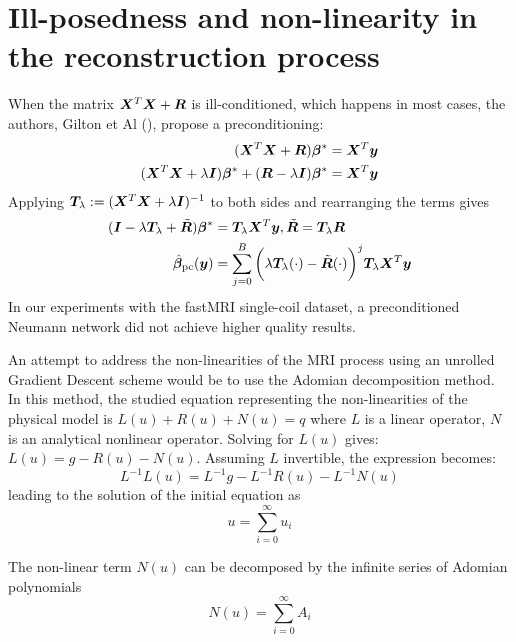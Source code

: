 \documentclass{article}
\begin{document}
\section{Ill-posedness and non-linearity in the reconstruction process}
When the matrix $\bm{X}^T \bm{X} + \bm{R}$ is ill-conditioned, which happens in most cases, the authors, Gilton et Al (\cite{DBLP:journals/corr/abs-1901-03707}),  propose a preconditioning:
\begin{align*}
	(\bm{X}^T \bm{X} + \bm{R}) \bm{\beta}^{\ast} &=	\bm{X}^T \bm{y} \\
	(\bm{X}^T \bm{X} + \lambda \bm{I})  \bm{\beta}^{\ast} + ( \bm{R} -  \lambda \bm{I})   \bm{\beta}^{\ast} &= \bm{X}^T \bm{y} \\
\end{align*}
Applying $	\bm{T}_{\lambda} := (\bm{X}^T \bm{X} + \lambda \bm{I})^{-1}$ to both sides and rearranging the terms gives
\begin{align*}
	(\bm{I} - \lambda \bm{T}_{\lambda} + \tilde{\bm{R}}) \bm{\beta}^{\ast} &= \bm{T}_{\lambda} \bm{X}^T \bm{y}, 
	 \tilde{\bm{R}} =  \bm{T}_{\lambda} \bm{R} \\
\hat{\bm{\beta}}_{\text{pc}}(\bm{y})  &=  \sum_{j=0}^{B}  \bigg( \lambda  \bm{T}_{\lambda}(\cdot) -   \tilde{\bm{R}}(\cdot) \bigg)^j  \bm{T}_{\lambda} \bm{X}^T \bm{y} \\		 
\end{align*}
In our experiments with the fastMRI single-coil dataset, a preconditioned Neumann network did not achieve higher quality results.

An attempt to address the non-linearities of the MRI process using an unrolled Gradient Descent scheme would be to use the Adomian decomposition method.
In this method, the studied equation representing the non-linearities of the physical model is $L(u) + R(u) + N(u)  = q$ where $L$ is a linear operator, $N$ is an analytical nonlinear operator. Solving for $L(u)$ gives: $L(u) = g - R(u) -N(u)$. Assuming $L$ invertible, the expression becomes:
\begin{equation}
	L^{-1} L (u) = L^{-1} g - L^{-1} R(u) - L^{-1} N(u) \label{eq:adom1}
\end{equation}
leading to the solution of the initial equation as
\begin{equation}
	u = \sum_{i=0}^\infty u_i \label{eq:adom2}
\end{equation}	
 
 The non-linear term $N(u)$ can be decomposed by the infinite series of Adomian polynomials
\begin{equation}
N(u) =  \sum_{i=0}^\infty A_i  \label{eq:adom3}
\end{equation}	
\end{document}
